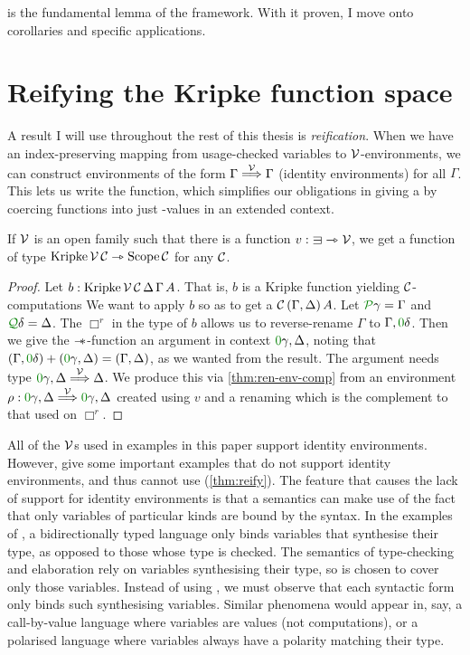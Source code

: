  is the fundamental lemma of the framework.
With it proven, I move onto corollaries and specific applications.

\section{Reifying the Kripke function space}\label{sec:reify}

A result I will use throughout the rest of this thesis is \emph{reification}.
When we have an index-preserving mapping from usage-checked variables to
$\V$-environments, we can construct environments of the form
$\Gamma \stackrel{\mathcal V}\Longrightarrow \Gamma$ (identity environments) for all $\Gamma$.
This lets us write the  function, which  simplifies our
obligations in giving a  by coercing
 functions into just
\AgdaBound{$\C$}-values in an extended context.

\begin{lemma}\label{thm:reify}
  If $\V$ is an open family such that there is a function
  $v : {\sqni} \rightarrowtriangle \V$, we get a function of type
  $\mathrm{Kripke}\,\mathcal V\,\mathcal C \rightarrowtriangle \mathrm{Scope}\,\mathcal C$ for any $\C$.
\end{lemma}
\begin{proof}
  Let $b : \mathrm{Kripke}\,\mathcal V\,\mathcal C\,\Delta\,\Gamma\,A$.
  That is, $b$ is a Kripke function yielding $\C$-computations
  We want to apply $b$ so as to get a $\C\,\plr{\Gamma, \Delta}\,A$.
  Let $\grP\gamma = \Gamma$ and $\grQ\delta = \Delta$.
  The $\Box^r$ in the type of $b$ allows us to reverse-rename $\Gamma$ to
  $\Gamma, \gr0\delta$.
  Then we give the $\mathrel{\mathord{-}\hspace{-0.75ex}*}$-function an argument in context
  $\gr0\gamma, \Delta$, noting that
  $\plr{\Gamma, \gr0\delta} + \plr{\gr0\gamma, \Delta} = \plr{\Gamma, \Delta}$,
  as we wanted from the result.
  The argument needs type $\gr0\gamma, \Delta \env\V \Delta$.
  We produce this via \cref{thm:ren-env-comp} from an environment
  $\rho : \gr0\gamma, \Delta \env\V \gr0\gamma, \Delta$ created using $v$
  and a renaming which is the complement to that used on $\Box^r$.
\end{proof}

All of the $\V$s used in examples in this paper support identity environments.
However, \citet[p.~27]{AACMM21} give some important examples that do not
support identity environments, and thus cannot use 
(\cref{thm:reify}).
The feature that causes the lack of support for identity environments is that
a semantics can make use of the fact that only variables of particular kinds
are bound by the syntax.
In the examples of \citeauthor{AACMM21}, a bidirectionally typed language only
binds variables that synthesise their type, as opposed to those whose type is
checked.
The semantics of type-checking and elaboration rely on variables synthesising
their type, so \AgdaBound{$\V$} is chosen to cover only those variables.
Instead of using , we must observe that each syntactic form
only binds such synthesising variables.
Similar phenomena would appear in, say, a call-by-value language where
variables are values (not computations), or a polarised language where
variables always have a polarity matching their type.


